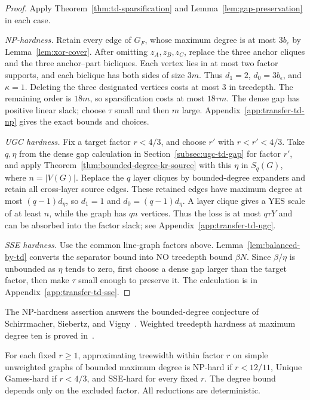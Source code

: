 \begin{proof}
Apply Theorem~\ref{thm:td-sparsification} and
Lemma~\ref{lem:gap-preservation} in each case.

\emph{NP-hardness.}
Retain every edge of $G_F$, whose maximum degree is at most
$3b_\epsilon$ by Lemma~\ref{lem:xor-cover}. After omitting
$z_A,z_B,z_C$, replace the three anchor cliques and the three
anchor--part bicliques. Each vertex lies in at most two factor
supports, and each biclique has both sides of size $3m$.
Thus $d_1=2$, $d_0=3b_\epsilon$, and $\kappa=1$.
Deleting the three designated vertices costs at most $3$ in treedepth.
The remaining order is $18m$, so sparsification costs at most $18\tau m$.
The dense gap has positive linear slack; choose $\tau$ small and then
$m$ large. Appendix~\ref{app:transfer-td-np} gives the exact bounds
and choices.

\emph{UGC hardness.}
Fix a target factor $r<4/3$, and choose $r'$ with
$r<r'<4/3$. Take $q,\eta$ from the dense gap calculation in
Section~\ref{subsec:ugc-td-gap} for factor $r'$, and apply
Theorem~\ref{thm:bounded-degree-kr-source} with this $\eta$ in
$S_q(G)$, where $n=|V(G)|$. Replace the $q$ layer cliques by
bounded-degree expanders and retain all cross-layer source edges. These retained edges have
maximum degree at most $(q-1)d_\eta$, so $d_1=1$ and
$d_0=(q-1)d_\eta$. A layer clique gives a YES scale of at least $n$, while the graph
has $qn$ vertices. Thus the loss is at most $q\tau Y$ and can be
absorbed into the factor slack; see Appendix~\ref{app:transfer-td-ugc}.

\emph{SSE hardness.}
Use the common line-graph factors above.
Lemma~\ref{lem:balanced-by-td} converts the separator bound into
NO treedepth bound $\beta N$. Since $\beta/\eta$ is unbounded as $\eta$ tends to zero, first
choose a dense gap larger than the target factor, then make $\tau$
small enough to preserve it. The calculation is in
Appendix~\ref{app:transfer-td-sse}.

\end{proof}

The NP-hardness assertion answers the bounded-degree conjecture of
Schirrmacher, Siebertz, and
Vigny~\cite[Conjecture~1]{SchirrmacherSiebertzVigny2025}.
Weighted treedepth hardness at maximum degree ten is proved
in~\cite{DirksEtAl2025Weighted}.

\begin{corollary}
\label{cor:tw-bounded-degree}
\label{thm:tw-bounded-degree}
\label{thm:tw-ugc-bounded-degree}
\label{thm:tw-sse-bounded-degree}
For each fixed $r\ge1$, approximating treewidth within factor $r$
on simple unweighted graphs of bounded maximum degree is
NP-hard if $r<12/11$, Unique Games-hard if $r<4/3$, and
SSE-hard for every fixed $r$.
The degree bound depends only on the excluded factor. All reductions
are deterministic.
\end{corollary}

